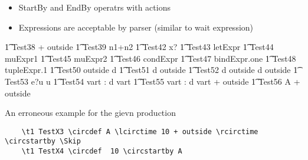 \documentclass{article}
\begin{document}
\begin{itemize}
	\item StartBy and EndBy operatrs with actions
	\item Expressions are acceptable by parser (similar to wait expression)
\end{itemize}
%
\begin{circusaction}
   \t1 Test38 \circdef {} + outside \rcirctime \circstartby \Skip
   \also
   \t1 Test39 \circdef \lcirctime n1+n2 \rcirctime \circstartby \Skip 
   \also
   \t1 Test42 \circdef \lcirctime x? \rcirctime \circstartby \Skip
   \also
   \t1 Test43 \circdef \lcirctime letExpr \rcirctime \circstartby \Skip
   \also
   \t1 Test44 \circdef \lcirctime muExpr1 \rcirctime \circstartby \Skip
   \also
   \t1 Test45 \circdef \lcirctime muExpr2 \rcirctime \circstartby \Skip
   \also
   \t1 Test46 \circdef \lcirctime condExpr \rcirctime \circstartby \Skip
   \also
   \t1 Test47 \circdef \lcirctime bindExpr.one \rcirctime \circstartby \Skip
   \also
   \t1 Test48 \circdef \lcirctime tupleExpr.1 \rcirctime \circstartby \Skip
   \also   
   \t1 Test50 \circdef \lcirctime outside  \rcirctime \circstartby d \then \Skip
   \also
   \t1 Test51 \circdef d \then \lcirctime outside  \rcirctime \circstartby \Skip
   \also
   \t1 Test52 \circdef d \then \lcirctime outside  \rcirctime \circstartby d \then \lcirctime    
   outside \rcirctime \circstartby \Skip
   \also
   \t1 Test53 \circdef e?u \then \lcirctime u  \rcirctime \circstartby \Skip
   \also
   \t1 Test54 \circdef  \circvres vart : \nat \circspot  d \then \lcirctime vart  \rcirctime 
   \circstartby \Skip
   \also
   \t1 Test55 \circdef  \circvres vart : \nat \circspot  d \then \lcirctime vart + outside  
   \rcirctime \circstartby \Skip
   \also
   \t1 Test56 \circdef  A \circseq {} + outside \rcirctime \circstartby \Skip 
\end{circusaction}

An erroneous example for the gievn production 
\begin{verbatim}
	\t1 TestX3 \circdef A \lcirctime 10 + outside \rcirctime \circstartby \Skip 
	\t1 TestX4 \circdef  10 \circstartby A 
\end{verbatim}
\end{document}
